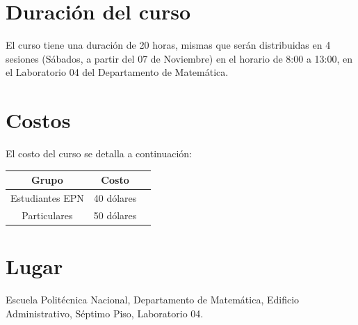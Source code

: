 \documentclass[11pt,a4paper,oneside]{article}\usepackage[]{graphicx}\usepackage[]{color}
\begin{document}
\section{Duración del curso}
  
El curso tiene una duración de 20 horas, mismas que serán distribuidas en 4 sesiones (Sábados, a partir del 07 de Noviembre) en el horario de 8:00 a 13:00, en el Laboratorio 04 del Departamento de Matemática.

\section{Costos}

El costo del curso se detalla a continuación:

\begin{center}
\begin{tabular}{|c|c|c|}\hline
{\bf Grupo} & {\bf Costo}\\ \hline
Estudiantes EPN & 40 dólares \\ \hline
Particulares & 50 dólares\\ \hline
\end{tabular}
\end{center}

\section{Lugar}

Escuela Politécnica Nacional, Departamento de Matemática, Edificio Administrativo, Séptimo Piso, Laboratorio 04.
\end{document}
